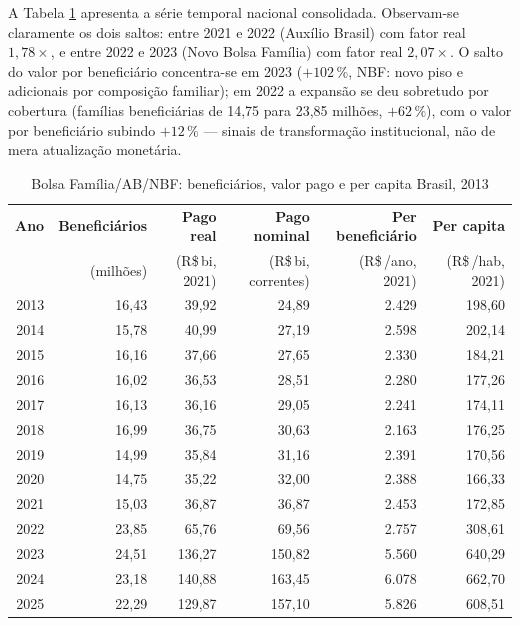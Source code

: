 \documentclass[12pt,a4paper,oneside]{article}
\newcommand{\rs}{R\$\,}
\begin{document}
A Tabela \ref{tab:evol-pbf} apresenta a série temporal nacional
consolidada. Observam-se claramente os dois saltos: entre 2021 e
2022 (Auxílio Brasil) com fator real $1,78\times$, e entre 2022 e
2023 (Novo Bolsa Família) com fator real $2,07\times$. O salto do
valor por beneficiário concentra-se em 2023 ($+102\,\%$, NBF: novo
piso e adicionais por composição familiar); em 2022 a expansão se deu
sobretudo por cobertura (famílias beneficiárias de 14,75 para 23,85
milhões, $+62\,\%$), com o valor por beneficiário subindo $+12\,\%$
— sinais de transformação institucional, não de mera atualização
monetária.

\begin{table}[H]
\centering
\caption{Bolsa Família/AB/NBF: beneficiários, valor pago e per capita Brasil, 2013}
\begin{tabular}{rrrrrr}
\toprule
\textbf{Ano} & \textbf{Beneficiários} & \textbf{Pago real} & \textbf{Pago nominal} & \textbf{Per beneficiário} & \textbf{Per capita} \\
   & (milhões)             & (\rs bi, 2021) & (\rs bi, correntes) & (\rs/ano, 2021) & (\rs/hab, 2021) \\
\midrule
2013 & 16,43 &  39,92 &  24,89 & 2.429 & 198,60 \\
2014 & 15,78 &  40,99 &  27,19 & 2.598 & 202,14 \\
2015 & 16,16 &  37,66 &  27,65 & 2.330 & 184,21 \\
2016 & 16,02 &  36,53 &  28,51 & 2.280 & 177,26 \\
2017 & 16,13 &  36,16 &  29,05 & 2.241 & 174,11 \\
2018 & 16,99 &  36,75 &  30,63 & 2.163 & 176,25 \\
2019 & 14,99 &  35,84 &  31,16 & 2.391 & 170,56 \\
2020 & 14,75 &  35,22 &  32,00 & 2.388 & 166,33 \\
2021 & 15,03 &  36,87 &  36,87 & 2.453 & 172,85 \\
2022 & 23,85 &  65,76 &  69,56 & 2.757 & 308,61 \\
2023 & 24,51 & 136,27 & 150,82 & 5.560 & 640,29 \\
2024 & 23,18 & 140,88 & 163,45 & 6.078 & 662,70 \\
2025 & 22,29 & 129,87 & 157,10 & 5.826 & 608,51 \\
\bottomrule
\end{tabular}
\par{}
\label{tab:evol-pbf}
\end{table}
\end{document}
